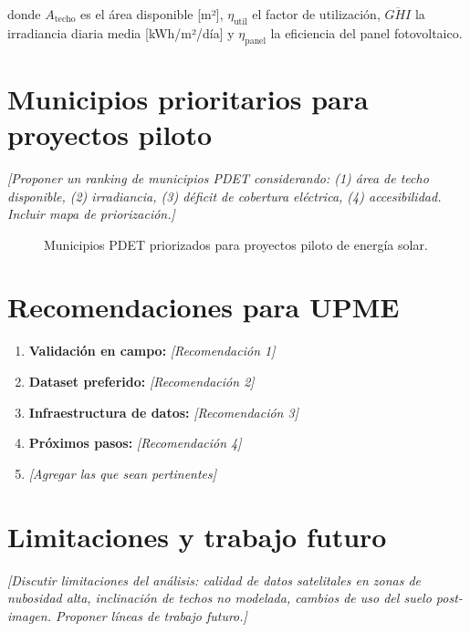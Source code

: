 \documentclass[12pt, a4paper]{report}
\begin{document}
donde $A_{\text{techo}}$ es el área disponible [m²], $\eta_{\text{util}}$
el factor de utilización, $\overline{GHI}$ la irradiancia diaria media
[kWh/m²/día] y $\eta_{\text{panel}}$ la eficiencia del panel fotovoltaico.

\section{Municipios prioritarios para proyectos piloto}

\textit{[Proponer un ranking de municipios PDET considerando: (1) área
de techo disponible, (2) irradiancia, (3) déficit de cobertura eléctrica,
(4) accesibilidad. Incluir mapa de priorización.]}

\begin{figure}[H]
  \centering
  \caption{Municipios PDET priorizados para proyectos piloto de energía solar.}
  \label{fig:priorizacion}
\end{figure}

\section{Recomendaciones para UPME}

\begin{enumerate}[label=\textbf{R\arabic*.}, leftmargin=2.5cm]
  \item \textbf{Validación en campo:} \textit{[Recomendación 1]}
  \item \textbf{Dataset preferido:} \textit{[Recomendación 2]}
  \item \textbf{Infraestructura de datos:} \textit{[Recomendación 3]}
  \item \textbf{Próximos pasos:} \textit{[Recomendación 4]}
  \item \textit{[Agregar las que sean pertinentes]}
\end{enumerate}

\section{Limitaciones y trabajo futuro}

\textit{[Discutir limitaciones del análisis: calidad de datos satelitales en
zonas de nubosidad alta, inclinación de techos no modelada, cambios de uso del
suelo post-imagen. Proponer líneas de trabajo futuro.]}
\end{document}
